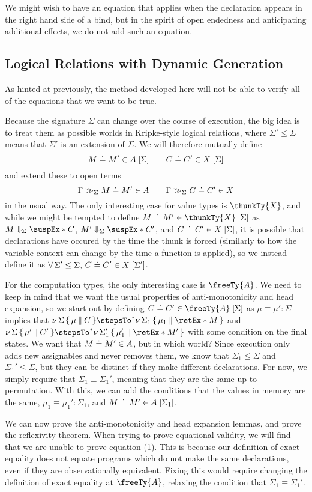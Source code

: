 \documentclass[letterpaper]{article}
\begin{document}
We might wish to have an equation that applies when the declaration appears in the right hand side of a bind, but in the spirit of open endedness and anticipating additional effects, we do not add such an equation.

\subsection{Logical Relations with Dynamic Generation}

As hinted at previously, the method developed here will not be able to verify all of the equations that we want to be true.

Because the signature \(\Sigma\) can change over the course of execution, the big idea is to treat them as possible worlds in Kripke-style logical relations, where \(\Sigma' \le \Sigma\) means that \(\Sigma'\) is an extension of \(\Sigma\).
We will therefore mutually define \[M\mathrel{\doteq}M' \in A \;[\Sigma] \qquad C\mathrel{\doteq}C' \in X \;[\Sigma]\] and extend these to open terms \[\Gamma \gg_\Sigma M\mathrel{\doteq}M' \in A \qquad \Gamma \gg_\Sigma C\mathrel{\doteq}C' \in X\] in the usual way.
The only interesting case for value types is \(\thunkTy{X}\), and while we might be tempted to define \(\exEqOf{M}{M'}{\thunkTy{X}} \;[\Sigma]\) as \(M \Downarrow_\Sigma \suspEx*{C}\), \(M' \Downarrow_\Sigma \suspEx*{C'}\), and \(C\mathrel{\doteq}C' \in X \;[\Sigma]\), it is possible that declarations have occured by the time the thunk is forced (similarly to how the variable context can change by the time a function is applied), so we instead define it as \(\forall\, \Sigma' \le \Sigma,\, C\mathrel{\doteq}C' \in X \;[\Sigma']\).

For the computation types, the only interesting case is \(\freeTy{A}\).
We need to keep in mind that we want the usual properties of anti-monotonicity and head expansion, so we start out by defining \(\exEqOf{C}{C'}{\freeTy{A}} \;[\Sigma]\) as \(\mu \equiv \mu' : \Sigma\) implies that \(\dmemState{\Sigma}{\mu}{C} \stepsTo^* \dmemState{\Sigma_1}{\mu_1}{\retEx*{M}}\) and \(\dmemState{\Sigma}{\mu'}{C'} \stepsTo^* \dmemState{\Sigma_1'}{\mu_1'}{\retEx*{M'}}\) with some condition on the final states.
We want that \(M\mathrel{\doteq}M' \in A\), but in which world?
Since execution only adds new assignables and never removes them, we know that \(\Sigma_1 \le \Sigma\) and \(\Sigma_1' \le \Sigma\), but they can be distinct if they make different declarations.
For now, we simply require that \(\Sigma_1 \equiv \Sigma_1'\), meaning that they are the same up to permutation.
With this, we can add the conditions that the values in memory are the same, \(\mu_1 \equiv \mu_1' : \Sigma_1\), and \(M\mathrel{\doteq}M' \in A \;[\Sigma_1]\).

We can now prove the anti-monotonicity and head expansion lemmas, and prove the reflexivity theorem.
When trying to prove equational validity, we will find that we are unable to prove equation (1).
This is because our definition of exact equality does not equate programs which do not make the same declarations, even if they are observationally equivalent.
Fixing this would require changing the definition of exact equality at \(\freeTy{A}\), relaxing the condition that \(\Sigma_1 \equiv \Sigma_1'\).
\end{document}
